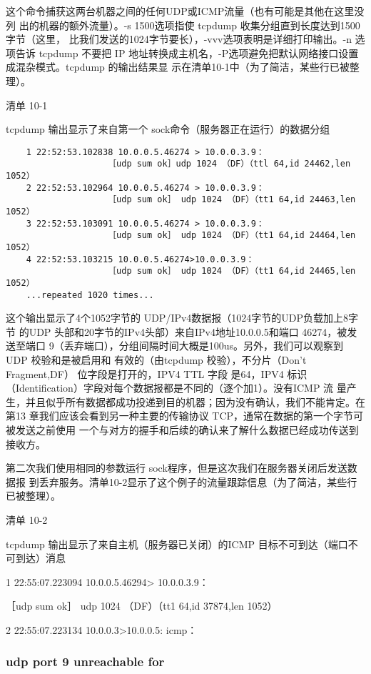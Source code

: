 这个命令捕获这两台机器之间的任何UDP或ICMP流量（也有可能是其他在这里没列
出的机器的额外流量）。-s 1500选项指使 tcpdump 收集分组直到长度达到1500字节（这里，
比我们发送的1024字节要长），-vvv选项表明是详细打印输出。-n 选项告诉 tcpdump 不要把
IP 地址转换成主机名，-P选项避免把默认网络接口设置成混杂模式。tcpdump 的输出结果显
示在清单10-1中（为了简洁，某些行已被整理）。

清单 10-1

tcpdump 输出显示了来自第一个 sock命令（服务器正在运行）的数据分组
\begin{verbatim}
    1 22:52:53.102838 10.0.0.5.46274 > 10.0.0.3.9：
                    ［udp sum ok］udp 1024 （DF）（ttl 64,id 24462,len 1052）
    2 22:52:53.102964 10.0.0.5.46274 > 10.0.0.3.9：
                    ［udp sum ok］ udp 1024 （DF）（tt1 64,id 24463,len 1052）
    3 22:52:53.103091 10.0.0.5.46274 > 10.0.0.3.9：
                    ［udp sum ok］ udp 1024 （DF）（tt1 64,id 24464,len 1052）
    4 22:52:53.103215 10.0.0.5.46274>10.0.0.3.9：
                    ［udp sum ok］ udp 1024 （DF）（tt1 64,id 24465,len 1052）
    ...repeated 1020 times...
\end{verbatim}

这个输出显示了4个1052字节的 UDP/IPv4数据报（1024字节的UDP负载加上8字节
的UDP 头部和20字节的IPv4头部）来自IPv4地址10.0.0.5和端口 46274，被发送至端口
9（丢弃端口），分组间隔时间大概是100us。另外，我们可以观察到 UDP 校验和是被启用和
有效的（由tcpdump 校验），不分片（Don't Fragment,DF） 位字段是打开的，IPV4 TTL 字段
是64，IPV4 标识（Identification）字段对每个数据报都是不同的（逐个加1）。没有ICMP 流
量产生，并且似乎所有数据都成功投递到目的机器；因为没有确认，我们不能肯定。在第13
章我们应该会看到另一种主要的传输协议 TCP，通常在数据的第一个字节可被发送之前使用
一个与对方的握手和后续的确认来了解什么数据已经成功传送到接收方。

第二次我们使用相同的参数运行 sock程序，但是这次我们在服务器关闭后发送数据报
到丢弃服务。清单10-2显示了这个例子的流量跟踪信息（为了简洁，某些行已被整理）。

清单 10-2

tcpdump 输出显示了来自主机（服务器已关闭）的ICMP 目标不可到达（端口不可到达）消息

1 22:55:07.223094 10.0.0.5.46294> 10.0.0.3.9：

［udp sum ok］ udp 1024 （DF）（tt1 64,id 37874,len 1052）

2 22:55:07.223134 10.0.0.3>10.0.0.5: icmp：

\subsubsection{udp port 9 unreachable for}
